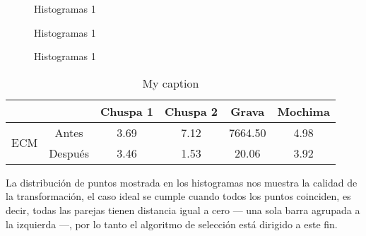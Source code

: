 \begin{figure}[h]
	\centering     %
	\hspace{1mm}%
	
	\caption[Histogramas 1]{Histogramas 1}
	\label{imagen:grid:0752-match}
\end{figure}

\begin{figure}[h]
	\centering     %
	\hspace{3mm}%
	
	\caption[Histogramas 1]{Histogramas 1}
	\label{imagen:grid:0752-hist}
\end{figure}
\begin{figure}[h]
	\centering     %
	\hspace{1mm}%
	
	\caption[Histogramas 1]{Histogramas 1}
	\label{imagen:grid:0752-align}
\end{figure}

\begin{table}[]\centering
	\centering
	\caption{My caption}
	\label{my-label}
	\begin{tabular}{@{}lccccc@{}}
		\toprule
		\multicolumn{2}{l}{}           			 & Chuspa 1 & Chuspa 2 & Grava & Mochima \\ \midrule
		\multirow{2}{*}{ECM} &\hfill Antes \hfill\vline& 3.69     & 7.12     &7664.50& 4.98    \\
							& Después      \vline& 3.46     & 1.53     & 20.06 & 3.92    \\
							
		\bottomrule 
	\end{tabular}
\end{table}

La distribución de puntos mostrada en los histogramas nos muestra la calidad de la transformación, el caso ideal se cumple cuando todos los puntos coinciden, es decir, todas las parejas tienen distancia igual a cero --- una sola barra agrupada a la izquierda ---, por lo tanto el algoritmo de selección está dirigido a este fin. 

